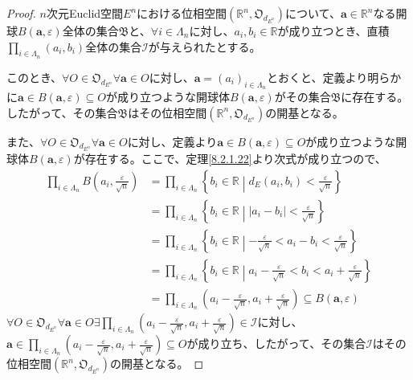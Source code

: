 \documentclass[dvipdfmx]{jsarticle}
\begin{document}
\begin{proof}
$n$次元Euclid空間$E^{n}$における位相空間$\left( \mathbb{R}^{n},\mathfrak{O}_{d_{E^{n}}} \right)$について、$\mathbf{a} \in \mathbb{R}^{n}$なる開球$B\left( \mathbf{a},\varepsilon \right)$全体の集合$\mathfrak{B}$と、$\forall i \in \varLambda_{n}$に対し、$a_{i},b_{i} \in \mathbb{R}$が成り立つとき、直積$\prod_{i \in \varLambda_{n}} \left( a_{i},b_{i} \right)$全体の集合$\mathcal{I}$が与えられたとする。\par
このとき、$\forall O \in \mathfrak{O}_{d_{E^{n}}}\forall\mathbf{a} \in O$に対し、$\mathbf{a} = \left( a_{i} \right)_{i \in \varLambda_{n}}$とおくと、定義より明らかに$\mathbf{a} \in B\left( \mathbf{a},\varepsilon \right) \subseteq O$が成り立つような開球体$B\left( \mathbf{a},\varepsilon \right)$がその集合$\mathfrak{B}$に存在する。したがって、その集合$\mathfrak{B}$はその位相空間$\left( \mathbb{R}^{n},\mathfrak{O}_{d_{E^{n}}} \right)$の開基となる。\par
また、$\forall O \in \mathfrak{O}_{d_{E^{n}}}\forall\mathbf{a} \in O$に対し、定義より$\mathbf{a} \in B\left( \mathbf{a},\varepsilon \right) \subseteq O$が成り立つような開球体$B\left( \mathbf{a},\varepsilon \right)$が存在する。ここで、定理\ref{8.2.1.22}より次式が成り立つので、
\begin{align*}
\prod_{i \in \varLambda_{n}} {B\left( a_{i},\frac{\varepsilon}{\sqrt{n}} \right)} &= \prod_{i \in \varLambda_{n}} \left\{ b_{i} \in \mathbb{R} \middle| d_{E}\left( a_{i},b_{i} \right) < \frac{\varepsilon}{\sqrt{n}} \right\}\\
&= \prod_{i \in \varLambda_{n}} \left\{ b_{i} \in \mathbb{R} \middle| \left| a_{i} - b_{i} \right| < \frac{\varepsilon}{\sqrt{n}} \right\}\\
&= \prod_{i \in \varLambda_{n}} \left\{ b_{i} \in \mathbb{R} \middle| - \frac{\varepsilon}{\sqrt{n}} < a_{i} - b_{i} < \frac{\varepsilon}{\sqrt{n}} \right\}\\
&= \prod_{i \in \varLambda_{n}} \left\{ b_{i} \in \mathbb{R} \middle| a_{i} - \frac{\varepsilon}{\sqrt{n}} < b_{i} < a_{i} + \frac{\varepsilon}{\sqrt{n}} \right\}\\
&= \prod_{i \in \varLambda_{n}} \left( a_{i} - \frac{\varepsilon}{\sqrt{n}},a_{i} + \frac{\varepsilon}{\sqrt{n}} \right) \subseteq B\left( \mathbf{a},\varepsilon \right)
\end{align*}
$\forall O \in \mathfrak{O}_{d_{E^{n}}}\forall\mathbf{a} \in O\exists\prod_{i \in \varLambda_{n}} \left( a_{i} - \frac{\varepsilon}{\sqrt{n}},a_{i} + \frac{\varepsilon}{\sqrt{n}} \right)\in \mathcal{I}$に対し、$\mathbf{a} \in \prod_{i \in \varLambda_{n}} \left( a_{i} - \frac{\varepsilon}{\sqrt{n}},a_{i} + \frac{\varepsilon}{\sqrt{n}} \right) \subseteq O$が成り立ち、したがって、その集合$\mathcal{I}$はその位相空間$\left( \mathbb{R}^{n},\mathfrak{O}_{d_{E^{n}}} \right)$の開基となる。
\end{proof}
\end{document}
